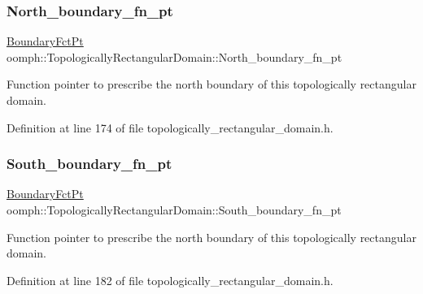 \subsubsection{\texorpdfstring{North\+\_\+boundary\+\_\+fn\+\_\+pt}{North\_boundary\_fn\_pt}}
{\footnotesize\ttfamily \hyperlink{classoomph_1_1TopologicallyRectangularDomain_a8b2e24f5500d86c93aef509c5410e7cc}{Boundary\+Fct\+Pt} oomph\+::\+Topologically\+Rectangular\+Domain\+::\+North\+\_\+boundary\+\_\+fn\+\_\+pt\hspace{0.3cm}{\ttfamily [private]}}



Function pointer to prescribe the north boundary of this topologically rectangular domain. 



Definition at line 174 of file topologically\+\_\+rectangular\+\_\+domain.\+h.

\mbox{\label{classoomph_1_1TopologicallyRectangularDomain_a48aa6d308f504b63b6f080ed486a1248}} 
\subsubsection{\texorpdfstring{South\+\_\+boundary\+\_\+fn\+\_\+pt}{South\_boundary\_fn\_pt}}
{\footnotesize\ttfamily \hyperlink{classoomph_1_1TopologicallyRectangularDomain_a8b2e24f5500d86c93aef509c5410e7cc}{Boundary\+Fct\+Pt} oomph\+::\+Topologically\+Rectangular\+Domain\+::\+South\+\_\+boundary\+\_\+fn\+\_\+pt\hspace{0.3cm}{\ttfamily [private]}}



Function pointer to prescribe the north boundary of this topologically rectangular domain. 



Definition at line 182 of file topologically\+\_\+rectangular\+\_\+domain.\+h.

\mbox{\label{classoomph_1_1TopologicallyRectangularDomain_ab565242c7de0d10b36ec0a2e7a219bf9}} 
